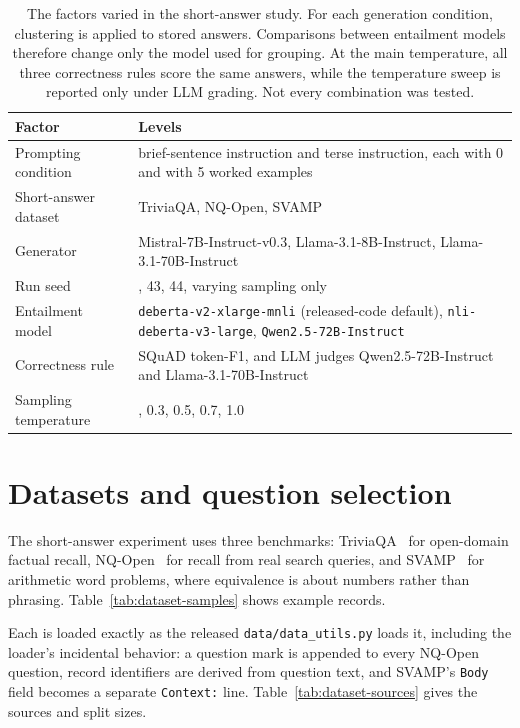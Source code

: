 \begin{table}[htb]
\centering
\small
\caption{The factors varied in the short-answer study. For each generation
  condition, clustering is applied to stored answers. Comparisons between
  entailment models therefore change only the model used for grouping. At the
  main temperature, all three correctness rules score the same answers, while
  the temperature sweep is reported only under LLM grading. Not every combination was tested.}
\label{tab:grid-at-a-glance}
\begingroup
\setlength{\tabcolsep}{4pt}
\begin{tabular}{@{}>{\raggedright\arraybackslash}p{2.9cm}>{\raggedright\arraybackslash}p{7.3cm}@{}}
\toprule
Factor & Levels \\
\midrule
Prompting condition &
  brief-sentence instruction and terse instruction, each with 0 and with 5
  worked examples \\
Short-answer dataset &
  TriviaQA, NQ-Open, SVAMP \\
Generator &
  Mistral-7B-Instruct-v0.3, Llama-3.1-8B-Instruct, Llama-3.1-70B-Instruct \\
Run seed &
  42, 43, 44, varying sampling only \\
Entailment model &
  \texttt{deberta-v2-xlarge-mnli} (released-code default),
  \texttt{nli-deberta-v3-large}, \texttt{Qwen2.5-72B-Instruct} \\
Correctness rule &
  SQuAD token-F1, and LLM judges Qwen2.5-72B-Instruct and
  Llama-3.1-70B-Instruct \\
Sampling temperature &
  0.1, 0.3, 0.5, 0.7, 1.0 \\
\bottomrule
\end{tabular}
\endgroup
\end{table}

\section{Datasets and question selection}
\label{sec:datasets}

The short-answer experiment uses three benchmarks:
TriviaQA~\cite{joshi_triviaqa_2017} for open-domain factual recall,
NQ-Open~\cite{lee_nq_open_2019} for recall from real search queries, and
SVAMP~\cite{patel_svamp_2021} for arithmetic word problems, where equivalence
is about numbers rather than phrasing. Table~\ref{tab:dataset-samples} shows
example records.

Each is loaded exactly as the released \texttt{data/data\_utils.py} loads it,
including the loader's incidental behavior: a question mark is appended to
every NQ-Open question, record identifiers are derived from question text,
and SVAMP's \texttt{Body} field becomes a separate \texttt{Context:}
line. Table~\ref{tab:dataset-sources} gives the sources and split sizes.

